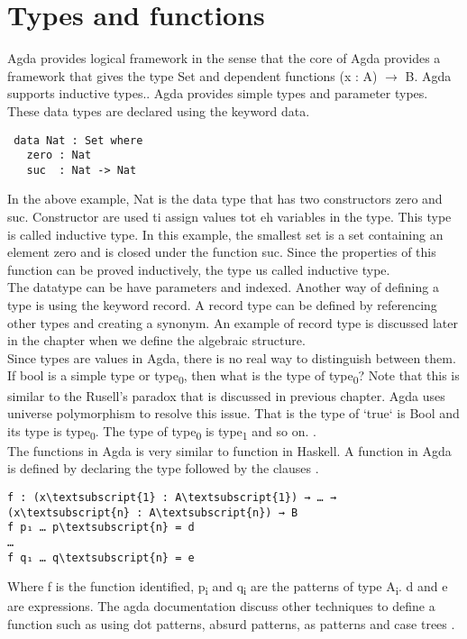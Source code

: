 \section{Types and functions}
Agda provides logical framework in the sense that the core of Agda provides a framework that gives the type Set and dependent functions (x : A) \(\rightarrow\) B. Agda supports inductive types.\cite{10.1007/978-3-642-03359-9_6}. Agda provides simple types and parameter types. These data types are declared using the keyword data. \\
\begin{Verbatim}
 data Nat : Set where
   zero : Nat
   suc  : Nat -> Nat
\end{Verbatim}
In the above example, Nat is the data type that has two constructors zero and suc. Constructor are used ti assign values tot eh variables in the type. This type is called inductive type. In this example, the smallest set is a set containing an element zero and is closed under the function suc. Since the properties of this function can be proved inductively, the type us called inductive type. \cite{enwiki:1127496533}\\ The datatype can be have parameters and	 indexed.  
Another way of defining a type is using the keyword record. A record type can be defined by referencing other types and creating a synonym. An example of record type is discussed later in the chapter when we define the algebraic structure.\\
Since types are values in Agda, there is no real way to distinguish between them. If bool is a simple type or type\textsubscript{0}, then what is the type of type\textsubscript{0}? Note that this is similar to the Rusell's paradox that is discussed in previous chapter. Agda uses universe polymorphism to resolve this issue. That is the type of `true` is Bool and its type is type\textsubscript{0}. The type of  type\textsubscript{0} is type\textsubscript{1} and so on. \cite{kidney2020finiteness}.\\

The functions in Agda is very similar to function in Haskell. A function in Agda is defined by declaring the type followed by the clauses \cite{agdaFunction}. 
\begin{Verbatim}[commandchars=\\\{\},samepage=true]
f : (x\textsubscript{1} : A\textsubscript{1}) → … → (x\textsubscript{n} : A\textsubscript{n}) → B
f p₁ … p\textsubscript{n} = d
…
f q₁ … q\textsubscript{n} = e
\end{Verbatim} 
Where f is the function identified, p\textsubscript{i} and q\textsubscript{i} are the patterns of type A\textsubscript{i}. d and e are expressions. 
The agda documentation discuss other techniques to define a function such as using dot patterns, absurd patterns, as patterns and case trees \cite{agdaFunction}.\\

